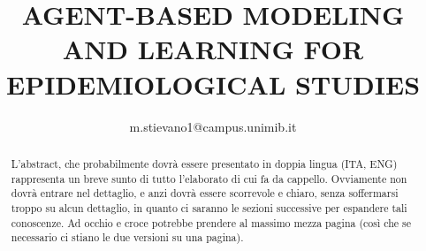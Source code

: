 \documentclass{article}
\title{AGENT-BASED MODELING AND LEARNING FOR EPIDEMIOLOGICAL STUDIES}
\author{m.stievano1@campus.unimib.it}
\begin{document}


\begin{abstract}
    L'abstract, che probabilmente dovrà essere presentato in doppia lingua (ITA, ENG)
    rappresenta un breve sunto di tutto l'elaborato di cui fa da cappello. 
    Ovviamente non dovrà entrare nel dettaglio, e anzi dovrà essere scorrevole e 
    chiaro, senza soffermarsi troppo su alcun dettaglio, in quanto ci saranno 
    le sezioni successive per espandere tali conoscenze. Ad occhio e croce potrebbe
    prendere al massimo mezza pagina (così che se necessario ci stiano le due versioni su una pagina).
\end{abstract}



\tableofcontents
\newpage















% 

\nocite{*}

% 
% 


\end{document}
